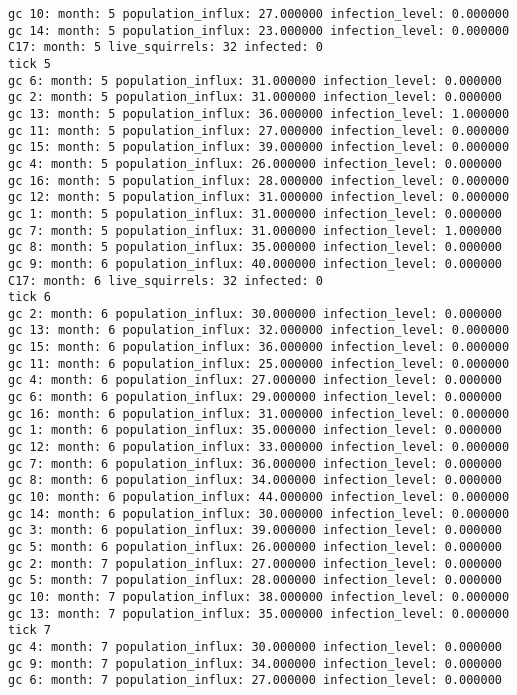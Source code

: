 \begin{lstlisting}[basicstyle=\small]
gc 10: month: 5 population_influx: 27.000000 infection_level: 0.000000
gc 14: month: 5 population_influx: 23.000000 infection_level: 0.000000
C17: month: 5 live_squirrels: 32 infected: 0
tick 5
gc 6: month: 5 population_influx: 31.000000 infection_level: 0.000000
gc 2: month: 5 population_influx: 31.000000 infection_level: 0.000000
gc 13: month: 5 population_influx: 36.000000 infection_level: 1.000000
gc 11: month: 5 population_influx: 27.000000 infection_level: 0.000000
gc 15: month: 5 population_influx: 39.000000 infection_level: 0.000000
gc 4: month: 5 population_influx: 26.000000 infection_level: 0.000000
gc 16: month: 5 population_influx: 28.000000 infection_level: 0.000000
gc 12: month: 5 population_influx: 31.000000 infection_level: 0.000000
gc 1: month: 5 population_influx: 31.000000 infection_level: 0.000000
gc 7: month: 5 population_influx: 31.000000 infection_level: 1.000000
gc 8: month: 5 population_influx: 35.000000 infection_level: 0.000000
gc 9: month: 6 population_influx: 40.000000 infection_level: 0.000000
C17: month: 6 live_squirrels: 32 infected: 0
tick 6
gc 2: month: 6 population_influx: 30.000000 infection_level: 0.000000
gc 13: month: 6 population_influx: 32.000000 infection_level: 0.000000
gc 15: month: 6 population_influx: 36.000000 infection_level: 0.000000
gc 11: month: 6 population_influx: 25.000000 infection_level: 0.000000
gc 4: month: 6 population_influx: 27.000000 infection_level: 0.000000
gc 6: month: 6 population_influx: 29.000000 infection_level: 0.000000
gc 16: month: 6 population_influx: 31.000000 infection_level: 0.000000
gc 1: month: 6 population_influx: 35.000000 infection_level: 0.000000
gc 12: month: 6 population_influx: 33.000000 infection_level: 0.000000
gc 7: month: 6 population_influx: 36.000000 infection_level: 0.000000
gc 8: month: 6 population_influx: 34.000000 infection_level: 0.000000
gc 10: month: 6 population_influx: 44.000000 infection_level: 0.000000
gc 14: month: 6 population_influx: 30.000000 infection_level: 0.000000
gc 3: month: 6 population_influx: 39.000000 infection_level: 0.000000
gc 5: month: 6 population_influx: 26.000000 infection_level: 0.000000
gc 2: month: 7 population_influx: 27.000000 infection_level: 0.000000
gc 5: month: 7 population_influx: 28.000000 infection_level: 0.000000
gc 10: month: 7 population_influx: 38.000000 infection_level: 0.000000
gc 13: month: 7 population_influx: 35.000000 infection_level: 0.000000
tick 7
gc 4: month: 7 population_influx: 30.000000 infection_level: 0.000000
gc 9: month: 7 population_influx: 34.000000 infection_level: 0.000000
gc 6: month: 7 population_influx: 27.000000 infection_level: 0.000000

\end{lstlisting}
